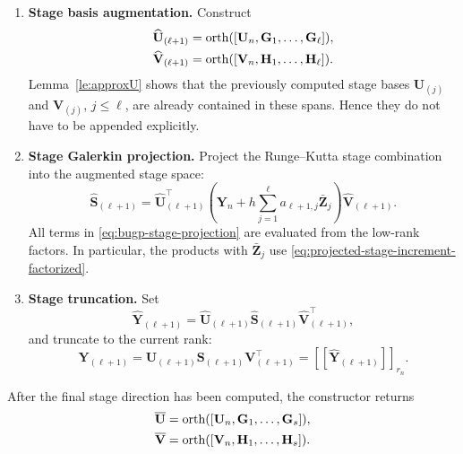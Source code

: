 \documentclass[preprint,runningheads]{svjour3}
\def\wh{\widehat}
\def\wt{\widetilde}
\def\wt{\overline}
\newcommand\bfG{{\mathbf G}}
\newcommand\bfH{{\mathbf H}}
\newcommand\bfS{{\mathbf S}}
\newcommand\bfU{{\mathbf U}}
\newcommand\bfV{{\mathbf V}}
\newcommand\bfY{{\mathbf Y}}
\newcommand\bfZ{{\mathbf Z}}
\begin{document}
\begin{enumerate}
\item {\bf Stage basis augmentation.}
Construct
\[
\begin{aligned}
    \wh\bfU_{(\ell+1)}
    &=
    {\rm orth}
    ([\bfU_n,\bfG_1,\ldots,\bfG_\ell]), \\
    \wh\bfV_{(\ell+1)}
    &=
    {\rm orth}
    ([\bfV_n,\bfH_1,\ldots,\bfH_\ell]).
\end{aligned}
\]
Lemma~\ref{le:approxU} shows that the previously computed stage bases
$\bfU_{(j)}$ and $\bfV_{(j)}$, $j\le \ell$, are already contained in these
spans. Hence they do not have to be appended explicitly.

\item {\bf Stage Galerkin projection.}
Project the Runge--Kutta stage combination into the augmented stage space:
\begin{equation}
\label{eq:bugp-stage-projection}
    \wh\bfS_{(\ell+1)}
    =
    \wh\bfU_{(\ell+1)}^\top
    \left(
        \bfY_n
        +
        h\sum_{j=1}^{\ell}a_{\ell+1,j}\bar\bfZ_j
    \right)
    \wh\bfV_{(\ell+1)} .
\end{equation}
All terms in \eqref{eq:bugp-stage-projection} are evaluated from the low-rank
factors. In particular, the products with $\bar\bfZ_j$ use
\eqref{eq:projected-stage-increment-factorized}.

\item {\bf Stage truncation.}
Set
\[
    \wh\bfY_{(\ell+1)}
    =
    \wh\bfU_{(\ell+1)}
    \wh\bfS_{(\ell+1)}
    \wh\bfV_{(\ell+1)}^\top,
\]
and truncate to the current rank:
\[
    \bfY_{(\ell+1)}
    =
    \bfU_{(\ell+1)}
    \bfS_{(\ell+1)}
    \bfV_{(\ell+1)}^\top
    =
    [\![\wh\bfY_{(\ell+1)}]\!]_{r_n}.
\]
\end{enumerate}

After the final stage direction has been computed, the constructor returns
\begin{equation}
\label{eq:bugp-final-rk-basis}
\begin{aligned}
    \wt\bfU
    &=
    {\rm orth}
    ([\bfU_n,\bfG_1,\ldots,\bfG_s]), \\
    \wt\bfV
    &=
    {\rm orth}
    ([\bfV_n,\bfH_1,\ldots,\bfH_s]).
\end{aligned}
\end{equation}
\end{document}
